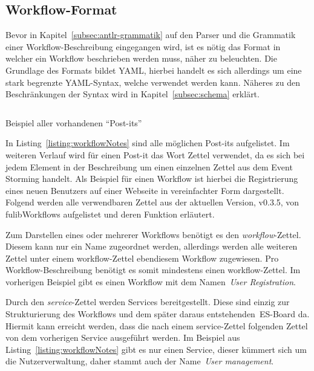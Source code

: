 \subsection{Workflow-Format}\label{subsec:workflow-format}
Bevor in Kapitel~\ref{subsec:antlr-grammatik} auf den Parser und die Grammatik einer Workflow-Beschreibung eingegangen wird,
ist es nötig das Format in welcher ein Workflow beschrieben werden muss, näher zu beleuchten.
Die Grundlage des Formats bildet \ac{YAML}, hierbei handelt es sich allerdings um eine stark begrenzte YAML-Syntax, welche verwendet werden kann.
Näheres zu den Beschränkungen der Syntax wird in Kapitel~\ref{subsec:schema} erklärt.

\begin{listing}[!ht]
    \inputminted{yaml}{listings/3.1.1/allNotes.es.yaml}
    \caption{Beispiel aller vorhandenen ``Post-its''}
    \label{listing:workflowNotes}
\end{listing}

In Listing~\ref{listing:workflowNotes} sind alle möglichen Post-its aufgelistet.
Im weiteren Verlauf wird für einen Post-it das Wort Zettel verwendet, da es sich bei jedem Element in der Beschreibung um einen einzelnen Zettel aus dem Event Storming handelt.
Als Beispiel für einen Workflow ist hierbei die Registrierung eines neuen Benutzers auf einer Webseite in vereinfachter Form dargestellt.
Folgend werden alle verwendbaren Zettel aus der aktuellen Version, v0.3.5, von fulibWorkflows aufgelistet und deren Funktion erläutert.


Zum Darstellen eines oder mehrerer Workflows benötigt es den \textit{workflow}-Zettel.
Diesem kann nur ein Name zugeordnet werden, allerdings werden alle weiteren Zettel unter einem workflow-Zettel ebendiesem Workflow zugewiesen.
Pro Workflow-Beschreibung benötigt es somit mindestens einen workflow-Zettel.
Im vorherigen Beispiel gibt es einen Workflow mit dem Namen~\textit{User Registration}.


Durch den \textit{service}-Zettel werden Services bereitgestellt.
Diese sind einzig zur Strukturierung des Workflows und dem später daraus entstehenden~\ac{ES}-Board da.
Hiermit kann erreicht werden, dass die nach einem service-Zettel folgenden Zettel von dem vorherigen Service ausgeführt werden.
Im Beispiel aus Listing~\ref{listing:workflowNotes} gibt es nur einen Service, dieser kümmert sich um die Nutzerverwaltung, daher
stammt auch der Name~\textit{User management}.

